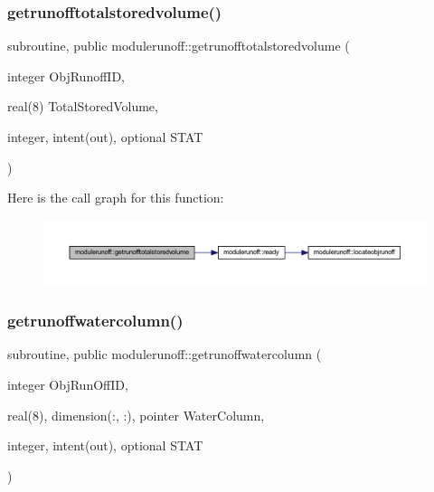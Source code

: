 \subsubsection{\texorpdfstring{getrunofftotalstoredvolume()}{getrunofftotalstoredvolume()}}
{\footnotesize\ttfamily subroutine, public modulerunoff\+::getrunofftotalstoredvolume (\begin{DoxyParamCaption}\item[{integer}]{Obj\+Runoff\+ID,  }\item[{real(8)}]{Total\+Stored\+Volume,  }\item[{integer, intent(out), optional}]{S\+T\+AT }\end{DoxyParamCaption})}

Here is the call graph for this function\+:
\nopagebreak
\begin{figure}[H]
\begin{center}
\leavevmode
\includegraphics[width=350pt]{namespacemodulerunoff_aa890e5ad105516c116e7c4f53b656bfb_cgraph}
\end{center}
\end{figure}
\mbox{\label{namespacemodulerunoff_a2f62616fa000a8f027d3557454de9b24}} 
\subsubsection{\texorpdfstring{getrunoffwatercolumn()}{getrunoffwatercolumn()}}
{\footnotesize\ttfamily subroutine, public modulerunoff\+::getrunoffwatercolumn (\begin{DoxyParamCaption}\item[{integer}]{Obj\+Run\+Off\+ID,  }\item[{real(8), dimension(\+:, \+:), pointer}]{Water\+Column,  }\item[{integer, intent(out), optional}]{S\+T\+AT }\end{DoxyParamCaption})}

